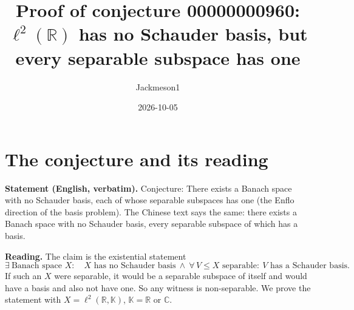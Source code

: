 \documentclass[11pt]{article}
\title{Proof of conjecture 00000000960:\\ $\ell^2(\mathbb{R})$ has no Schauder basis, but every separable subspace has one}
\author{Jackmeson1}
\date{2026-10-05}
\theoremstyle{definition}
\newcommand{\K}{\mathbb{K}}
\begin{document}
\maketitle

\section{The conjecture and its reading}

\textbf{Statement (English, verbatim).} Conjecture: There exists a Banach space with no Schauder
basis, each of whose separable subspaces has one (the Enflo direction of the basis problem).
The Chinese text says the same: there exists a Banach space with no Schauder basis, every
separable subspace of which has a basis.

\textbf{Reading.} The claim is the existential statement
\[
  \exists\ \text{Banach space } X:\quad X \text{ has no Schauder basis} \ \wedge\
  \forall\, V\le X \text{ separable}:\ V \text{ has a Schauder basis}.
\]
If such an $X$ were separable, it would be a separable subspace of itself and would have a basis
and also not have one. So any witness is non-separable. We prove the statement with
$X=\ell^2(\mathbb{R},\K)$, $\K=\mathbb{R}$ or $\mathbb{C}$.
\end{document}
